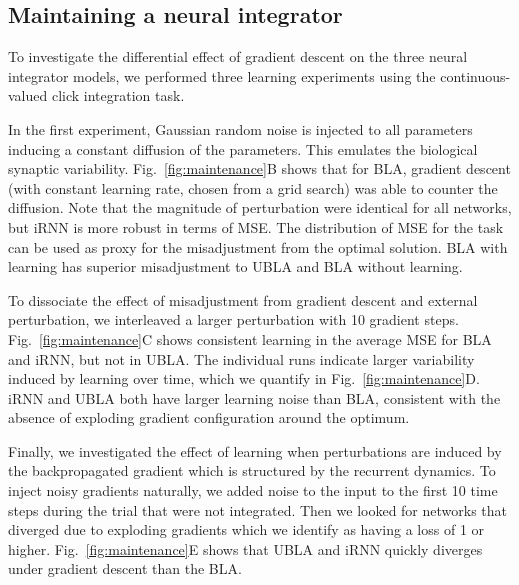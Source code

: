 \documentclass{article}
\newcounter{ct}
\theoremstyle{definition}
\theoremstyle{remark}
\begin{document}
\subsection{Maintaining a neural integrator}\label{sec:exp:maintaining}
To investigate the differential effect of gradient descent on the three neural integrator models, we performed three learning experiments using the continuous-valued click integration task.

In the first experiment, Gaussian random noise is injected to all parameters inducing a constant diffusion of the parameters.
This emulates the biological synaptic variability.
Fig.~\ref{fig:maintenance}B shows that for BLA, gradient descent (with constant learning rate, chosen from a grid search) was able to counter the diffusion.
Note that the magnitude of perturbation were identical for all networks, but iRNN is more robust in terms of MSE.
The distribution of MSE for the task can be used as proxy for the misadjustment from the optimal solution.
BLA with learning has superior misadjustment to UBLA and BLA without learning.

To dissociate the effect of misadjustment from gradient descent and external perturbation, we interleaved a larger perturbation with 10 gradient steps.
Fig.~\ref{fig:maintenance}C shows consistent learning in the average MSE for BLA and iRNN, but not in UBLA.
The individual runs indicate larger variability induced by learning over time, which we quantify in Fig.~\ref{fig:maintenance}D.
iRNN and UBLA both have larger learning noise than BLA, consistent with the absence of exploding gradient configuration around the optimum.

Finally, we investigated the effect of learning when perturbations are induced by the backpropagated gradient which is structured by the recurrent dynamics.
To inject noisy gradients naturally, we added noise to the input to the first 10 time steps during the trial that were not integrated.
Then we looked for networks that diverged due to exploding gradients which we identify as having a loss of 1 or higher. %
Fig.~\ref{fig:maintenance}E shows that UBLA and iRNN quickly diverges under gradient descent than the BLA.


\end{document}
